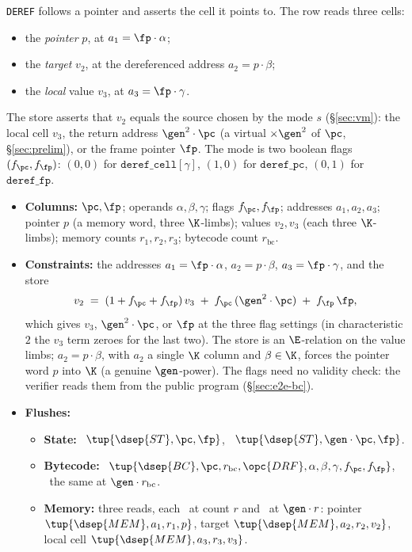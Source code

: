 \texttt{DEREF} follows a pointer and asserts the cell it points to. The row reads three cells:
\begin{itemize}
\item the \emph{pointer} $p$, at $a_1=\fp\cdot\alpha$;
\item the \emph{target} $v_2$, at the dereferenced address $a_2=p\cdot\beta$;
\item the \emph{local} value $v_3$, at $a_3=\fp\cdot\gamma$.
\end{itemize}
The store asserts that $v_2$ equals the source chosen by the mode $s$ (\S\ref{sec:vm}): the local cell $v_3$, the return address $\gen^{2}\cdot\pc$ (a virtual $\times\gen^{2}$ of $\pc$, \S\ref{sec:prelim}), or the frame pointer $\fp$. The mode is two boolean flags $(f_{\pc},f_{\fp})$: $(0,0)$ for $\texttt{deref\_cell}[\gamma]$, $(1,0)$ for $\texttt{deref\_pc}$, $(0,1)$ for $\texttt{deref\_fp}$.
\begin{itemize}
\item \textbf{Columns:} $\pc,\fp$; operands $\alpha,\beta,\gamma$; flags $f_{\pc},f_{\fp}$; addresses $a_1,a_2,a_3$; pointer $p$ (a memory word, three $\K$-limbs); values $v_2,v_3$ (each three $\K$-limbs); memory counts $r_1,r_2,r_3$; bytecode count $r_{\mathrm{bc}}$.
\item \textbf{Constraints:} the addresses $a_1=\fp\cdot\alpha$, $a_2=p\cdot\beta$, $a_3=\fp\cdot\gamma$, and the store
\[
  v_2 \;=\; (1+f_{\pc}+f_{\fp})\,v_3 \;+\; f_{\pc}\,(\gen^{2}\cdot\pc) \;+\; f_{\fp}\,\fp ,
\]
which gives $v_3$, $\gen^{2}\cdot\pc$, or $\fp$ at the three flag settings (in characteristic $2$ the $v_3$ term zeroes for the last two). The store is an $\E$-relation on the value limbs; $a_2=p\cdot\beta$, with $a_2$ a single $\K$ column and $\beta\in\K$, forces the pointer word $p$ into $\K$ (a genuine $\gen$-power). The flags need no validity check: the verifier reads them from the public program (\S\ref{sec:e2e-bc}).
\item \textbf{Flushes:}
  \begin{itemize}
  \item \textbf{State:} \pull\ $\tup{\dsep{ST},\pc,\fp}$, \push\ $\tup{\dsep{ST},\gen\cdot\pc,\fp}$.
  \item \textbf{Bytecode:} \pull\ $\tup{\dsep{BC},\pc,r_{\mathrm{bc}},\opc{DRF},\alpha,\beta,\gamma,f_{\pc},f_{\fp}}$, \push\ the same at $\gen\cdot r_{\mathrm{bc}}$.
  \item \textbf{Memory:} three reads, each \pull\ at count $r$ and \push\ at $\gen\cdot r$: pointer $\tup{\dsep{MEM},a_1,r_1,p}$, target $\tup{\dsep{MEM},a_2,r_2,v_2}$, local cell $\tup{\dsep{MEM},a_3,r_3,v_3}$.
  \end{itemize}
\end{itemize}

